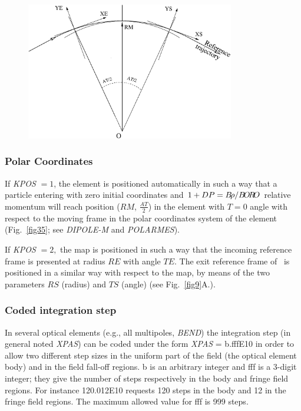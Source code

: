 \begin{figure}[H]
\begin{center}
~

~

\includegraphics[height=6cm]{Fig35.eps}
\end{center}
\end{figure}


\clearpage 

 \subsubsection*{Polar Coordinates} 
 
 If  \textsl{KPOS} $=1$,  the element is positioned automatically in such a way
that a particle entering with zero initial coordinates and 
$ 1+DP=B\!\rho /B\!O\!R\!O $ 
relative momentum will reach position ($ RM$, $\frac{AT }{ 2} $) in 
the element with $ T=0 $ angle with respect to the moving frame in the polar 
coordinates system of the element (Fig.~\ref{fig35}; 
see \textsl{DIPOLE-M} and \textsl{POLARMES}).

\noindent If  \textsl{KPOS} $=2, $ the map is positioned in such a way that the 
incoming reference frame is presented  at radius $ RE $ with angle $ TE $.  
The exit reference frame of \zgou\  is positioned in a similar way with 
respect to the map,  by means of 
the two parameters $ RS $ (radius) and $ TS $ (angle) (see Fig.~\ref{fig9}A.).  






 \subsubsection{Coded integration step} 

In several optical elements (e.g., all multipoles, \textsl{BEND}) the 
integration step (in general noted \textsl{XPAS}) can be coded under the 
form \textsl{XPAS} = b.fffE10 in order to allow two different step sizes 
in the uniform part of the field (the optical element  body) and in the field fall-off 
regions. b is an arbitrary integer and fff is a 3-digit integer; they give the 
number of steps respectively in the body and fringe field regions. For instance 
120.012E10 requests 120 steps in the body and 12 in the fringe field regions. The 
maximum allowed value for fff is 999 steps.



